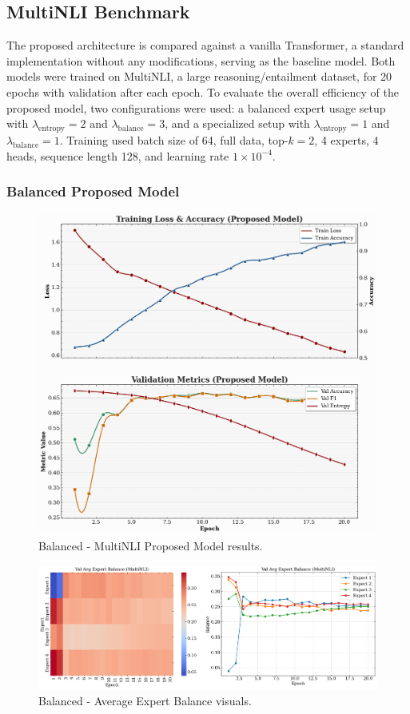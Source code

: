 \documentclass{article}
\begin{document}
\subsection{MultiNLI Benchmark}
The proposed architecture is compared against a vanilla Transformer, a standard implementation without any modifications, serving as the baseline model. Both models were trained on MultiNLI, a large reasoning/entailment dataset, for 20 epochs with validation after each epoch. To evaluate the overall efficiency of the proposed model, two configurations were used: a balanced expert usage setup with $\lambda_\text{entropy} = 2$ and $\lambda_\text{balance} = 3$, and a specialized setup with $\lambda_\text{entropy} = 1$ and $\lambda_\text{balance} = 1$. Training used batch size of 64, full data, top-$k = 2$, 4 experts, 4 heads, sequence length 128, and learning rate $1 \times 10^{-4}$.

\noindent
\subsubsection{Balanced Proposed Model}


\begin{figure}[H]
    \centering
    \includegraphics[width=0.7\linewidth]{b_proposed_mnli_stats.png}
    \caption{Balanced - MultiNLI Proposed Model results.}
    \label{fig:r}
\end{figure}


\begin{figure}[H]
    \centering
    \includegraphics[width=1\linewidth]{b_visuals_mnli.png}
    \caption{Balanced - Average Expert Balance visuals.}
    \label{fig:e}
\end{figure}
\end{document}

